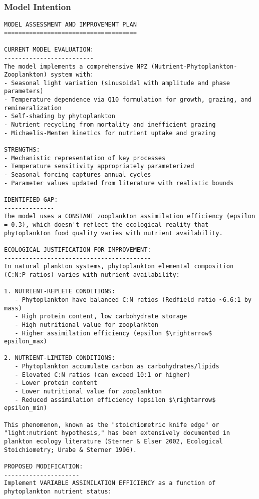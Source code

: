 \subsubsection{Model Intention}
\begin{lstlisting}
MODEL ASSESSMENT AND IMPROVEMENT PLAN
=====================================

CURRENT MODEL EVALUATION:
-------------------------
The model implements a comprehensive NPZ (Nutrient-Phytoplankton-Zooplankton) system with:
- Seasonal light variation (sinusoidal with amplitude and phase parameters)
- Temperature dependence via Q10 formulation for growth, grazing, and remineralization
- Self-shading by phytoplankton
- Nutrient recycling from mortality and inefficient grazing
- Michaelis-Menten kinetics for nutrient uptake and grazing

STRENGTHS:
- Mechanistic representation of key processes
- Temperature sensitivity appropriately parameterized
- Seasonal forcing captures annual cycles
- Parameter values updated from literature with realistic bounds

IDENTIFIED GAP:
--------------
The model uses a CONSTANT zooplankton assimilation efficiency (epsilon = 0.3), which doesn't reflect the ecological reality that phytoplankton food quality varies with nutrient availability.

ECOLOGICAL JUSTIFICATION FOR IMPROVEMENT:
-----------------------------------------
In natural plankton systems, phytoplankton elemental composition (C:N:P ratios) varies with nutrient availability:

1. NUTRIENT-REPLETE CONDITIONS:
   - Phytoplankton have balanced C:N ratios (Redfield ratio ~6.6:1 by mass)
   - High protein content, low carbohydrate storage
   - High nutritional value for zooplankton
   - Higher assimilation efficiency (epsilon $\rightarrow$ epsilon_max)

2. NUTRIENT-LIMITED CONDITIONS:
   - Phytoplankton accumulate carbon as carbohydrates/lipids
   - Elevated C:N ratios (can exceed 10:1 or higher)
   - Lower protein content
   - Lower nutritional value for zooplankton
   - Reduced assimilation efficiency (epsilon $\rightarrow$ epsilon_min)

This phenomenon, known as the "stoichiometric knife edge" or "light:nutrient hypothesis," has been extensively documented in plankton ecology literature (Sterner & Elser 2002, Ecological Stoichiometry; Urabe & Sterner 1996).

PROPOSED MODIFICATION:
---------------------
Implement VARIABLE ASSIMILATION EFFICIENCY as a function of phytoplankton nutrient status:


\end{lstlisting}

